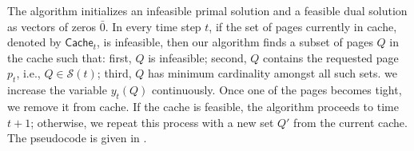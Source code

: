 \documentclass[11pt]{article}
\newcommand{\cS}{{\mathcal{S}}}
\begin{document}
The algorithm initializes an infeasible primal solution and a feasible dual solution as vectors of zeros $\bar{0}$. In every time step $t$, if the set of pages currently in cache, denoted by $\textsf{Cache}_t$, is infeasible, then our algorithm finds a subset of pages $Q$ in the cache such that: first, $Q$ is infeasible; second, $Q$ contains the requested page $p_t$, i.e., $Q \in \cS(t)$; third, $Q$ has minimum cardinality amongst all such sets.   %
we increase the variable $y_{t}(Q)$ continuously. %
Once one of the pages becomes tight, we remove it from cache. If the cache is feasible, the algorithm proceeds to time $t+1$; otherwise, we repeat this process with a new set $Q'$ from the current cache.  The pseudocode is given in . 

%
\end{document}
